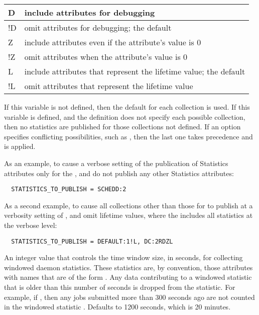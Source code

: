 \begin{description}
\begin{center}
\begin{table}[hbt]
\begin{tabular}{|p{2cm}p{12cm}|}
D & include attributes for debugging \\ \hline
!D & omit attributes for debugging; the default \\ \hline
Z & include attributes even if the attribute's value is 0 \\ \hline
!Z & omit attributes when the attribute's value is 0 \\ \hline
L & include attributes that represent the lifetime value;
the default \\ \hline
!L & omit attributes that represent the lifetime value \\ \hline
\end{tabular}
\end{table}
\end{center}

  If this variable is not defined, then the default for each collection 
  is used.
  If this variable is defined, and the definition does not specify each
  possible collection, then no statistics are published for those collections
  not defined.
  If an option specifies conflicting possibilities, such as ,
  then the last one takes precedence and is applied. 

  As an example, to cause a verbose setting of the publication of Statistics
  attributes only for the , and do not publish any other
  Statistics attributes:
\begin{verbatim}
  STATISTICS_TO_PUBLISH = SCHEDD:2
\end{verbatim}
  As a second example, to cause all collections other than 
  those for  to publish at a verbosity setting of ,
  and omit lifetime values, where the  includes all
  statistics at the verbose level:
\begin{verbatim}
  STATISTICS_TO_PUBLISH = DEFAULT:1!L, DC:2RDZL
\end{verbatim}
  
\label{param:StatisticsWindowSeconds}
\item[\Macro{STATISTICS\_WINDOW\_SECONDS}]
  An integer value that controls the time window size, in seconds, for
  collecting windowed daemon statistics.
  These statistics are, by convention, those attributes with names that 
  are of the form .  Any data contributing to a
  windowed statistic that is older than this number of seconds is dropped
  from the statistic.  
  For example, if ,
  then any jobs submitted more than 300 seconds ago are not counted 
  in the windowed statistic .  
  Defaults to 1200 seconds, which is 20 minutes.


\end{description}

